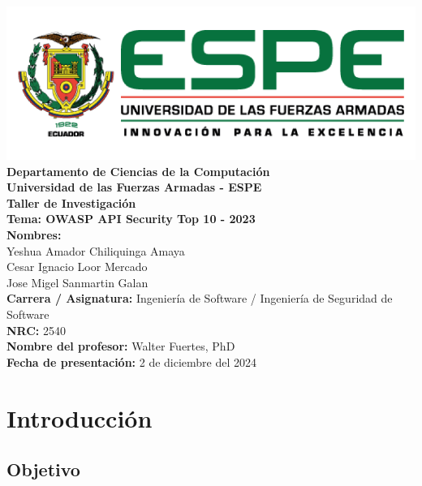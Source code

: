 \documentclass[a4paper,12pt]{article}
\begin{document}
\begin{titlepage}
    \centering
    \vspace*{1cm}
    \includegraphics[width=0.8\linewidth]{espe.png}\\[0.5cm]
    
    \Large \textbf{Departamento de Ciencias de la Computación}\\
    \large \textbf{Universidad de las Fuerzas Armadas - ESPE}\\[0.5cm]
    
    \Huge \textbf{Taller de Investigación}\\[0.3cm]
    \Large \textbf{Tema: OWASP API Security Top 10 - 2023}\\[0.8cm]
    
    \textbf{Nombres:}\\
    Yeshua Amador Chiliquinga Amaya\\
    Cesar Ignacio Loor Mercado\\
    Jose Migel Sanmartin Galan\\[0.3cm]
    
    \textbf{Carrera / Asignatura:} Ingeniería de Software / Ingeniería de Seguridad de Software\\
    \textbf{NRC:} 2540\\
    \textbf{Nombre del profesor:} Walter Fuertes, PhD\\[0.5cm]
    
    \textbf{Fecha de presentación:} 2 de diciembre del 2024\\[1cm]
    
    \vfill
\end{titlepage}
\tableofcontents
\newpage

\listoffigures
\listoftables
\newpage

\section{Introducci\'on}

\subsection{Objetivo}
\end{document}
